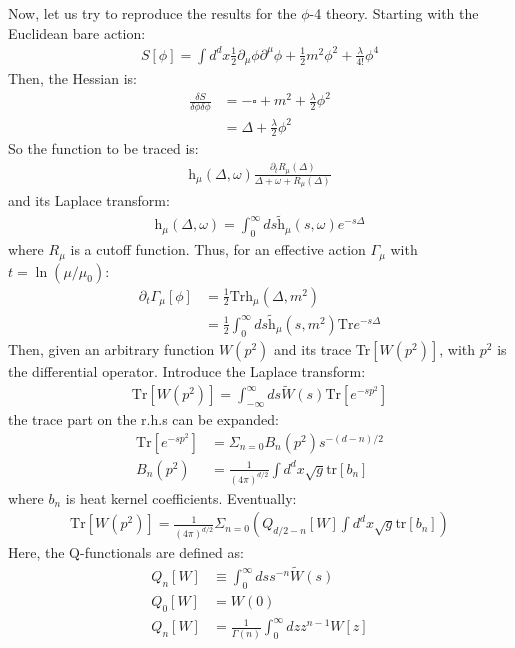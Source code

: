 \documentclass[fleqn]{article}
\begin{document}
Now, let us try to reproduce the results for the $\phi$-4 theory. Starting with the Euclidean bare action:
\begin{align}
  S[\phi] = \int d^{d}x \frac{1}{2}\partial_{\mu} \phi \partial ^{\mu} \phi + \frac{1}{2}m^{2}\phi ^{2} + \frac{\lambda}{4!}\phi ^{4}
\end{align}
Then, the Hessian is:
\begin{align}
  \frac{\delta S}{\delta \phi \delta \phi} & = - \square + m^{2} + \frac{\lambda}{2}\phi^{2} \nonumber \\
  &= \Delta + \frac{\lambda}{2} \phi^{2}
\end{align}
So the function to be traced is:
\begin{align}
  \text{h}_{\mu}(\Delta,\omega) \frac{\partial_{t}R_{\mu}(\Delta)}{\Delta+\omega+R_{\mu}(\Delta)}
\end{align}
and its Laplace transform:
\begin{align}
  \text{h}_{\mu}(\Delta,\omega) =\int_{0}^{\infty}ds\tilde{\text{h}}_{\mu}(s,\omega)e^{-s\Delta}
\end{align}
where $R_{\mu}$ is a cutoff function.
Thus, for an effective action $\Gamma_{\mu}$ with $t = \ln (\mu / \mu _{0})$:
\begin{align}
  \partial_{t}\Gamma_{\mu} [\phi]& =\frac{1}{2}\text{Tr}\text{h}_{\mu}(\Delta, m^{2}) \nonumber \\
  &= \frac{1}{2}\int_0^{\infty}ds\tilde{\text{h}}_{\mu} (s,m^{2})\text{Tr}e^{-s\Delta}
\end{align}
Then, given an arbitrary function $W(p^{2})$ and its trace Tr$[W(p^{2})]$, with $p^{2}$ is the differential operator. Introduce the Laplace transform:
\begin{align}
  \text{Tr}[W(p^{2})] = \int_{-\infty}^{\infty}ds\tilde{W}(s)\text{Tr}[e^{-sp^{2}}]
\end{align}
the trace part on the r.h.s can be expanded:
\begin{align}
  \text{Tr}[e^{-sp^{2}}] &= \Sigma_{n=0} B_{n}(p^{2})s^{-(d-n)/2} \\
  B_{n}(p^{2}) &= \frac{1}{(4\pi)^{d/2}}\int d^{d}x \sqrt{g} \text{tr} [b_n]
\end{align}
where $b_n$ is heat kernel coefficients. Eventually:
\begin{align}
  \text{Tr}[W(p^{2})] = \frac{1}{(4\pi)^{d/2}}\Sigma _{n=0}(Q_{d/2 - n}[W]\int d^{d}x \sqrt{g}\text{tr}[b_n])
\end{align}
Here, the Q-functionals are defined as:
\begin{align}
  Q_{n}[W] &\equiv \int_{0}^{\infty}ds s^{-n}\tilde{W}(s)\\
  Q_{0}[W] &= W(0) \\
  Q_{n}[W] &= \frac{1}{\Gamma(n)}\int_{0}^{\infty}dz z^{n-1}W[z]
\end{align}
\end{document}
